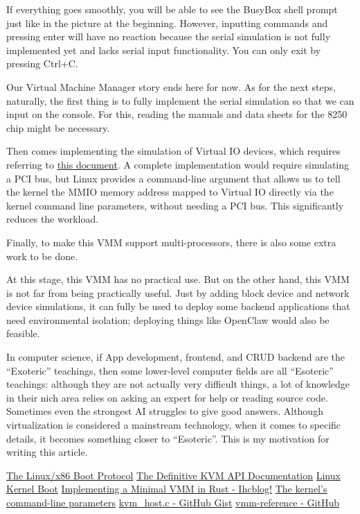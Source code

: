 If everything goes smoothly, you will be able to see the  BusyBox shell prompt just like in the picture at the beginning. However, inputting commands and pressing enter will have no reaction because the serial simulation is not fully implemented yet and lacks serial input functionality. You can only exit by pressing  Ctrl+C.


Our Virtual Machine Manager story ends here for now. As for the next steps, naturally, the first thing is to fully implement the serial simulation so that we can input on the console. For this, reading the manuals and data sheets for the  8250 chip might be necessary.

Then comes implementing the simulation of  Virtual IO devices, which requires referring to \href{https://docs.oasis-open.org/virtio/virtio/v1.0/virtio-v1.0.html}{this document}. A complete implementation would require simulating a  PCI bus, but  Linux provides a command-line argument that allows us to tell the kernel the  MMIO memory address mapped to  Virtual IO directly via the kernel command line parameters, without needing a  PCI bus. This significantly reduces the workload.

Finally, to make this VMM support multi-processors, there is also some extra work to be done.

At this stage, this VMM has no practical use. But on the other hand, this VMM is not far from being practically useful. Just by adding block device and network device simulations, it can fully be used to deploy some backend applications that need environmental isolation; deploying things like  OpenClaw would also be feasible.

In computer science, if  App development, frontend, and CRUD backend are the ``Exoteric'' teachings, then some lower-level computer fields are all ``Esoteric'' teachings: although they are not actually very difficult things, a lot of knowledge in their nich area relies on asking an expert for help or reading source code. Sometimes even the strongest  AI struggles to give good answers. Although virtualization is considered a mainstream technology, when it comes to specific details, it becomes something closer to ``Esoteric''. This is my motivation for writing this article.


\bli
    \li \href{https://www.kernel.org/doc/html/v6.1/x86/boot.html}{The Linux/x86 Boot Protocol}
    \li \href{https://docs.kernel.org/virt/kvm/api.html}{The Definitive KVM API Documentation}
    \li \href{https://wdv4758h.github.io/notes/blog/linux-kernel-boot.html}{Linux Kernel Boot}
    \li \href{https://www.ihcblog.com/rust-mini-vmm-1/}{Implementing a Minimal  VMM in Rust - Ihcblog!}
    \li \href{https://docs.kernel.org/admin-guide/kernel-parameters.html}{The kernel’s command-line parameters}
    \li \href{https://gist.github.com/zserge/ae9098a75b2b83a1299d19b79b5fe488}{kvm\_host.c - GitHub Gist}
    \li \href{https://github.com/rust-vmm/vmm-reference/}{vmm-reference - GitHub}
\eli

\bye